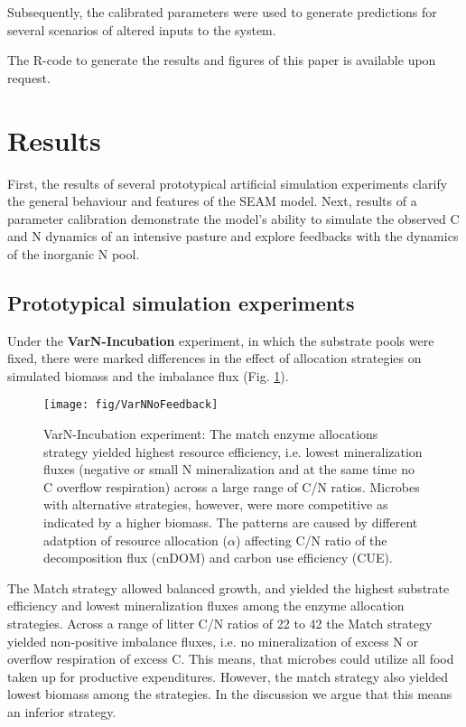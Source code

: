 Subsequently, the calibrated parameters were used to generate
predictions for several scenarios of altered inputs to the system.

The R-code to generate the results and figures of this paper is available upon
request. 
 

\section{Results}

First, the results of several prototypical artificial simulation experiments
clarify the general behaviour and features of the SEAM model. Next, results of a
parameter calibration demonstrate the model's ability to
simulate the observed C and N dynamics of an intensive pasture and explore
feedbacks with the dynamics of the inorganic N pool.

\subsection{Prototypical simulation experiments}
\label{sec:ResultsProto}

Under the \textbf{VarN-Incubation} experiment, in which the substrate pools were fixed,
there were marked differences in the effect of allocation strategies on simulated biomass and the imbalance flux (Fig.
\ref{fig:VarNNoFeedback}).
 
\begin{figure}[t] \vspace*{2mm}
\begin{center}
\texttt{[image: fig/VarNNoFeedback]}
\end{center}
\caption{
VarN-Incubation experiment: The match enzyme allocations strategy yielded
highest resource efficiency, i.e. lowest mineralization fluxes (negative or
small N mineralization and at the same time no C overflow respiration) across a
large range of C/N ratios.
Microbes with alternative strategies, however, were more competitive as
indicated by a higher biomass. The patterns are caused by different adatption of
resource allocation ($\alpha$) affecting C/N ratio of the decomposition flux
(cnDOM) and carbon use efficiency (CUE).
\label{fig:VarNNoFeedback}} 
\end{figure}

The Match strategy allowed balanced growth, and yielded the highest substrate
efficiency and lowest mineralization fluxes among the enzyme allocation
strategies. Across a range of litter C/N ratios of 22 to 42 the Match strategy
yielded non-positive imbalance fluxes, i.e. no mineralization of excess N or
overflow respiration of excess C. This means, that microbes could utilize all
food taken up for productive expenditures. However, the match strategy also
yielded lowest biomass among the strategies. In the
discussion we argue that this means an inferior strategy.

